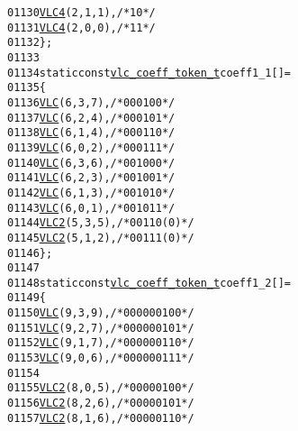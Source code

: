 \begin{footnotesize}
\begin{alltt}
01130         \hyperlink{vlc_8h_a02cdc921d8f03450b12879e8afb222cb}{VLC4}(2, 1, 1), \textcolor{comment}{/* 10 */}
01131         \hyperlink{vlc_8h_a02cdc921d8f03450b12879e8afb222cb}{VLC4}(2, 0, 0), \textcolor{comment}{/* 11 */}
01132 \};
01133 
01134 \textcolor{keyword}{static} \textcolor{keyword}{const} \hyperlink{structvlc__coeff__token__t}{vlc_coeff_token_t} coeff1\_1[] = 
01135 \{
01136         \hyperlink{vlc_8h_a7f3572774a720fd9b4bc3b1a0b65082f}{VLC}(6, 3, 7),   \textcolor{comment}{/* 0001 00 */}
01137         \hyperlink{vlc_8h_a7f3572774a720fd9b4bc3b1a0b65082f}{VLC}(6, 2, 4),   \textcolor{comment}{/* 0001 01 */}
01138         \hyperlink{vlc_8h_a7f3572774a720fd9b4bc3b1a0b65082f}{VLC}(6, 1, 4),   \textcolor{comment}{/* 0001 10 */}
01139         \hyperlink{vlc_8h_a7f3572774a720fd9b4bc3b1a0b65082f}{VLC}(6, 0, 2),   \textcolor{comment}{/* 0001 11 */}
01140         \hyperlink{vlc_8h_a7f3572774a720fd9b4bc3b1a0b65082f}{VLC}(6, 3, 6),   \textcolor{comment}{/* 0010 00 */}
01141         \hyperlink{vlc_8h_a7f3572774a720fd9b4bc3b1a0b65082f}{VLC}(6, 2, 3),   \textcolor{comment}{/* 0010 01 */}
01142         \hyperlink{vlc_8h_a7f3572774a720fd9b4bc3b1a0b65082f}{VLC}(6, 1, 3),   \textcolor{comment}{/* 0010 10 */}
01143         \hyperlink{vlc_8h_a7f3572774a720fd9b4bc3b1a0b65082f}{VLC}(6, 0, 1),   \textcolor{comment}{/* 0010 11*/}
01144         \hyperlink{vlc_8h_ad3cda36b9c6132357c7f7de5e52a6c93}{VLC2}(5, 3, 5),   \textcolor{comment}{/* 0011 0(0)*/}
01145         \hyperlink{vlc_8h_ad3cda36b9c6132357c7f7de5e52a6c93}{VLC2}(5, 1, 2),   \textcolor{comment}{/* 0011 1(0)*/}
01146 \};
01147 
01148 \textcolor{keyword}{static} \textcolor{keyword}{const} \hyperlink{structvlc__coeff__token__t}{vlc_coeff_token_t} coeff1\_2[] = 
01149 \{
01150         \hyperlink{vlc_8h_a7f3572774a720fd9b4bc3b1a0b65082f}{VLC}(9, 3, 9),   \textcolor{comment}{/* 0000 0010 0 */}
01151         \hyperlink{vlc_8h_a7f3572774a720fd9b4bc3b1a0b65082f}{VLC}(9, 2, 7),   \textcolor{comment}{/* 0000 0010 1 */}
01152         \hyperlink{vlc_8h_a7f3572774a720fd9b4bc3b1a0b65082f}{VLC}(9, 1, 7),   \textcolor{comment}{/* 0000 0011 0 */}
01153         \hyperlink{vlc_8h_a7f3572774a720fd9b4bc3b1a0b65082f}{VLC}(9, 0, 6),   \textcolor{comment}{/* 0000 0011 1 */}
01154 
01155         \hyperlink{vlc_8h_ad3cda36b9c6132357c7f7de5e52a6c93}{VLC2}(8, 0, 5),   \textcolor{comment}{/* 0000 0100 */}
01156         \hyperlink{vlc_8h_ad3cda36b9c6132357c7f7de5e52a6c93}{VLC2}(8, 2, 6),   \textcolor{comment}{/* 0000 0101 */}
01157         \hyperlink{vlc_8h_ad3cda36b9c6132357c7f7de5e52a6c93}{VLC2}(8, 1, 6),   \textcolor{comment}{/* 0000 0110 */}

\end{alltt}
\end{footnotesize}
